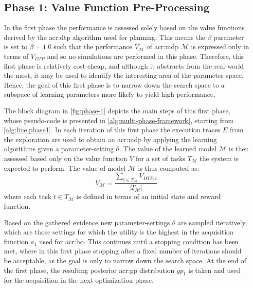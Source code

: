 \subsection{Phase 1: Value Function Pre-Processing}
\label{sec:phase-1}

In the first phase the performance is assessed solely based on the value functions derived by the \acrshort{acr:dtp} algorithm used for planning.
This means the $\beta$ parameter is set to $\beta = 1.0$ such that the performance $V_{\mathcal{M}}$ of \acrshort{acr:mdp} $\mathcal{M}$ is expressed only in terms of $V_\mathit{DTP}$ and so no simulations are performed in this phase.
Therefore, this first phase is relatively cost-cheap, and although it abstracts from the real-world the most, it may be used to identify the interesting area of the parameter space.
Hence, the goal of this first phase is to narrow down the search space to a subspace of learning parameters more likely to yield high performance.

The block diagram in \autoref{fig:phase-1} depicts the main steps of this first phase, whose pseudo-code is presented in \autoref{alg:multi-phase-framework}, starting from \autoref{alg:line:phase1}.
In each iteration of this first phase the execution traces $E$ from the exploration are used to obtain an \acrshort{acr:mdp} by applying the learning algorithms given a parameter-setting $\theta$.
The value of the learned model $\mathcal{M}$ is then assessed based only on the value function $V$ for a set of tasks $T_\mathcal{M}$ the system is expected to perform.
The value of model $\mathcal{M}$ is thus computed as:
\begin{equation*} 
V_{\mathcal{M}} = \frac{\sum_{t \in T_\mathcal{M}} V_{\mathit{DTP}, t}}{|T_\mathcal{M}|}
\end{equation*}
where each task $t \in T_\mathcal{M}$ is defined in terms of an initial state and reward function.

Based on the gathered evidence new parameter-settings $\theta$ are sampled iteratively, which are those settings for which the utility is the highest in the acquisition function $a_1$ used for \acrshort{acr:bo}.
This continues until a stopping condition has been met, where in this first phase stopping after a fixed number of iterations should be acceptable, as the goal is only to narrow down the search space.
At the end of the first phase, the resulting posterior \acrshort{acr:gp} distribution $\mathit{gp}_1$ is taken and used for the acquisition in the next optimization phase.

